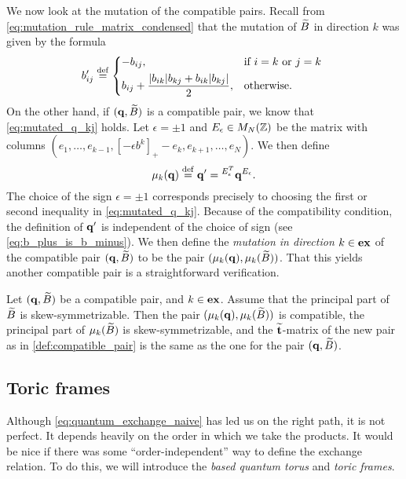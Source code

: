 We now look at the mutation of the compatible pairs. Recall from
\cref{eq:mutation_rule_matrix_condensed} that the mutation of $\widetilde{B}$ in direction $k$
was given by the formula
\begin{equation*}
	b'_{ij} \defeq \begin{dcases*}
		-b_{ij},                                            & if $i = k$ or $j = k$ \\
		b_{ij} + \frac{|b_{ik}|b_{kj} + b_{ik}|b_{kj}|}{2}, & otherwise.
	\end{dcases*}
\end{equation*}
%
On the other hand, if $(\mathbf{q}, \widetilde{B})$ is a compatible pair, we know that
\cref{eq:mutated_q_kj} holds. Let $\epsilon = \pm 1$ and $E_{\epsilon} \in M_N(\mathbb{Z})$
be the matrix with columns $(e_1, \dots, e_{k-1}, [-\epsilon b^k]_{+} - e_k, e_{k+1},
	\dots, e_N)$. We then define
\begin{equation}\label{eq:def_mutation_q}
	\mu_k(\mathbf{q}) \overset{\mathrm{def}}{=} \mathbf{q}' = \prescript{E_{\epsilon}^T}{}{}\mathbf{q}^{E_\epsilon}.
\end{equation}
%
The choice of the sign $\epsilon = \pm 1$ corresponds precisely to choosing the first
or second inequality in \cref{eq:mutated_q_kj}. Because of the compatibility condition,
the definition of $\mathbf{q}'$ is independent of the choice of sign (see
\cref{eq:b_plus_is_b_minus}). We then define the \emph{mutation in direction $k \in
		\mathbf{ex}$} of the compatible pair $(\mathbf{q}, \widetilde{B})$ to be
the pair $(\mu_k (\mathbf{q}),\mu_k (\widetilde{B}) )$. That this yields another compatible pair is a
straightforward verification.
\begin{proposition}\label{prop:mutation_preserves_good_things}

	Let $(\mathbf{q}, \widetilde{B})$ be a compatible pair, and $k \in \mathbf{ex}$. Assume that the principal part
	of $\widetilde{B}$ is skew-symmetrizable. Then the pair $(\mu_k (\mathbf{q}), \mu_k(\widetilde{B}))$ is
	compatible, the principal part of $\mu_k(\widetilde{B})$ is skew-symmetrizable, and the
	$\widetilde{\mathbf{t}}$-matrix of the new pair as in \cref{def:compatible_pair} is the same as the
	one for the pair $(\mathbf{q}, \widetilde{B})$.
\end{proposition}

\subsection{Toric frames}

Although \cref{eq:quantum_exchange_naive} has led us on the right path, it is not
perfect. It depends heavily on the order in which we take the products. It would be
nice if there was some ``order-independent'' way to define the exchange relation. To do
this, we will introduce the \emph{based quantum torus} and
\emph{toric frames}.

